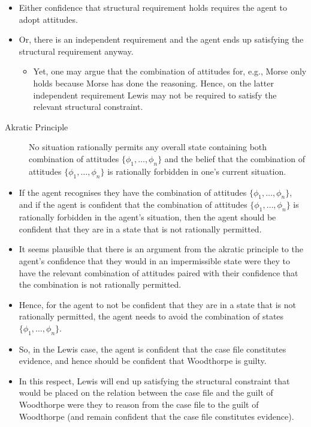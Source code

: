 \documentclass[10pt]{article}
\begin{document}
\begin{itemize}
\begin{itemize}
\begin{itemize}
    \item Either confidence that structural requirement holds requires the agent to adopt attitudes.
    \item Or, there is an independent requirement and the agent ends up satisfying the structural requirement anyway.
      \begin{itemize}
      \item Yet, one may argue that the combination of attitudes for, e.g., Morse only holds because Morse has done the reasoning.
        Hence, on the latter independent requirement Lewis may not be required to satisfy the relevant structural constraint.
      \end{itemize}
    \end{itemize}
  \end{itemize}
\end{itemize}

\begin{description}
\item[Akratic Principle] No situation rationally permits any overall state containing both combination of attitudes \(\{\phi_{1},\dots,\phi_{n}\}\) and the belief that the combination of attitudes \(\{\phi_{1},\dots,\phi_{n}\}\) is rationally forbidden in one's current situation.
\end{description}

\begin{itemize}
\item If the agent recognises they have the combination of attitudes \(\{\phi_{1},\dots,\phi_{n}\}\), and if the agent is confident that the combination of attitudes \(\{\phi_{1},\dots,\phi_{n}\}\) is rationally forbidden in the agent's situation, then the agent should be confident that they are in a state that is not rationally permitted.
\end{itemize}

\begin{itemize}
\item It seems plausible that there is an argument from the akratic principle to the agent's confidence that they would in an impermissible state were they to have the relevant combination of attitudes paired with their confidence that the combination is not rationally permitted.
\end{itemize}

\begin{itemize}
\item Hence, for the agent to not be confident that they are in a state that is not rationally permitted, the agent needs to avoid the combination of states \(\{\phi_{1},\dots,\phi_{n}\}\).
\item So, in the Lewis case, the agent is confident that the case file constitutes evidence, and hence should be confident that Woodthorpe is guilty.
\item In this respect, Lewis will end up satisfying the structural constraint that would be placed on the relation between the case file and the guilt of Woodthorpe were they to reason from the case file to the guilt of Woodthorpe (and remain confident that the case file constitutes evidence).
\end{itemize}
\end{document}
